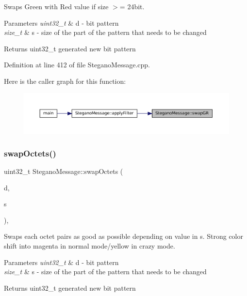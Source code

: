 Swaps Green with Red value if size $>$= 24bit. 


\begin{DoxyParams}{Parameters}
{\em uint32\+\_\+t} & d -\/ bit pattern \\
\hline
{\em size\+\_\+t} & s -\/ size of the part of the pattern that needs to be changed \\
\hline
\end{DoxyParams}
\begin{DoxyReturn}{Returns}
uint32\+\_\+t generated new bit pattern 
\end{DoxyReturn}


Definition at line 412 of file Stegano\+Message.\+cpp.

Here is the caller graph for this function\+:
\nopagebreak
\begin{figure}[H]
\begin{center}
\leavevmode
\includegraphics[width=350pt]{classSteganoMessage_a7e29a46073f2ef9c6e44bb1d46ad534f_icgraph}
\end{center}
\end{figure}
\mbox{\label{classSteganoMessage_a4751ad396485b5859b84970ddd20290d}} 
\subsubsection{\texorpdfstring{swapOctets()}{swapOctets()}}
{\footnotesize\ttfamily uint32\+\_\+t Stegano\+Message\+::swap\+Octets (\begin{DoxyParamCaption}\item[{uint32\+\_\+t}]{d,  }\item[{size\+\_\+t}]{s }\end{DoxyParamCaption})\hspace{0.3cm}{\ttfamily [static]}, {\ttfamily [private]}}



Swaps each octet pairs as good as possible depending on value in s. Strong color shift into magenta in normal mode/yellow in crazy mode. 


\begin{DoxyParams}{Parameters}
{\em uint32\+\_\+t} & d -\/ bit pattern \\
\hline
{\em size\+\_\+t} & s -\/ size of the part of the pattern that needs to be changed \\
\hline
\end{DoxyParams}
\begin{DoxyReturn}{Returns}
uint32\+\_\+t generated new bit pattern 
\end{DoxyReturn}


